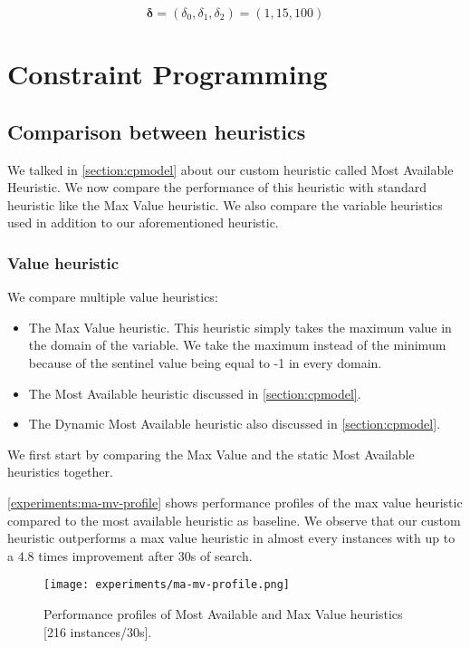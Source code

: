 \documentclass[../../thesis.tex]{subfiles}
\begin{document}
\begin{equation*}
  \bm{\delta} = (\delta_0, \delta_1, \delta_2) = (1, 15, 100)
\end{equation*}

\section{Constraint Programming}

\subsection{Comparison between heuristics}
\label{section:experiments:heuristics}

We talked in \autoref{section:cpmodel} about our custom heuristic called Most Available Heuristic.
We now compare the performance of this heuristic with standard heuristic like the Max Value heuristic.
We also compare the variable heuristics used in addition to our aforementioned heuristic.

\subsubsection{Value heuristic}

We compare multiple value heuristics:

\begin{itemize}
  \item The Max Value heuristic. This heuristic simply takes the maximum value in the domain of the variable. We 
  take the maximum instead of the minimum because of the sentinel value being equal to -1 in every domain. 
  \item The Most Available heuristic discussed in \autoref{section:cpmodel}.
  \item The Dynamic Most Available heuristic also discussed in \autoref{section:cpmodel}.
\end{itemize}

We first start by comparing the Max Value and the static Most Available heuristics together.

\autoref{experiments:ma-mv-profile} shows performance profiles of the max value heuristic compared to the most available heuristic 
as baseline. We observe that our custom heuristic outperforms a max value heuristic in almost every instances with 
up to a $4.8$ times improvement after 30s of search.

\begin{figure}
  \centering
  \texttt{[image: experiments/ma-mv-profile.png]}
  \caption{Performance profiles of Most Available and Max Value heuristics [216 instances/30s].}
  \label{experiments:ma-mv-profile}
\end{figure}
\end{document}
